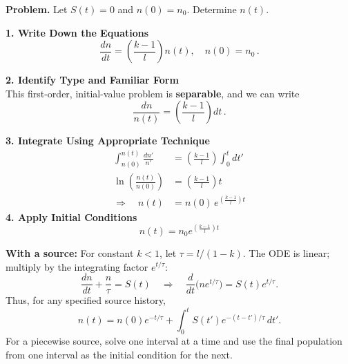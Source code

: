 \documentclass[compact]{ne630handout}
\begin{document}
\begin{handoutflow}



{\bf Problem.} Let $S(t) = 0$ and $n(0) = n_0$. Determine $n(t)$.


  {\small
  {\bf 1. Write Down the Equations}
  \begin{equation*}
   \frac{dn}{dt} =
    \left(\frac{k - 1}{l}\right)n(t),
    \quad n(0) = n_0 \, .
  \end{equation*}



  {\bf 2. Identify Type and Familiar Form}  \\


  This first-order, initial-value problem is {\bf separable}, and we can write
  \begin{equation*}
     \frac{dn}{n(t)} =
     \left(\frac{k - 1}{l}\right) dt \, .
  \end{equation*}
  }



  {\small
  {\bf 3. Integrate Using Appropriate Technique}
  \begin{align*}
    \int^{n(t)}_{n(0)} \frac{dn'}{n'} &=
     \left(\frac{k - 1}{l}\right)
     \int^{t}_{0} dt' \\[4pt]
    \ln\!\left(\frac{n(t)}{n(0)}\right)
      &= \left(\frac{k - 1}{l}\right)t \\[4pt]
    \Rightarrow \quad n(t)
      &= n(0)\, e^{\left(\displaystyle\frac{k - 1}{l}\right)t}
  \end{align*}
  {\bf 4. Apply Initial Conditions}
  \begin{equation*}
    \boxed{ n(t)  =  n_0 e^{\left ( \displaystyle\frac{k - 1}{l}  \right ) t} }
  \end{equation*}
  }

\textbf{With a source:} For constant $k<1$, let $\tau=l/(1-k)$.
The ODE is linear; multiply by the integrating factor $e^{t/\tau}$:
\[
 \frac{dn}{dt}+\frac{n}{\tau}=S(t)
 \quad\Longrightarrow\quad
 \frac{d}{dt}\big(ne^{t/\tau}\big)=S(t)e^{t/\tau}.
\]
Thus, for any specified source history,
\[
 \boxed{n(t)=n(0)e^{-t/\tau}
       +\int_0^t S(t')e^{-(t-t')/\tau}\,dt'.}
\]
For a piecewise source, solve one interval at a time and use the final
population from one interval as the initial condition for the next.



\end{handoutflow}
\end{document}
